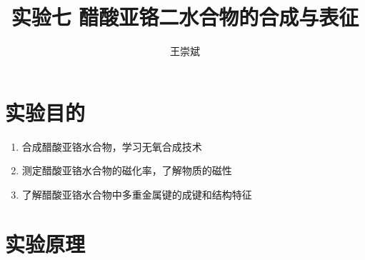 \documentclass[a4paper,zihao=5,UTF8]{ctexart}
\title{\textbf{实验七 醋酸亚铬二水合物的合成与表征}\cite{inorganic_chemistry_1}}
\author{王崇斌\;1800011716}
\begin{document}
	\pagestyle{fancy}
	\pagestyle{fancy}
	\chead{}
	\rhead{\today}
	\maketitle
    \thispagestyle{fancy}
    \section{实验目的}
    \begin{enumerate}
        \item 合成醋酸亚铬水合物，学习无氧合成技术
        \item 测定醋酸亚铬水合物的磁化率，了解物质的磁性
        \item 了解醋酸亚铬水合物中多重金属键的成键和结构特征
    \end{enumerate}
    \section{实验原理}
\end{document}
